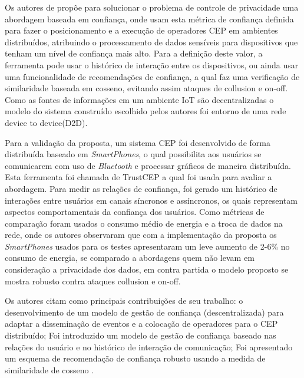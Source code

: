 \documentclass[ti,table]{texufpel} %
\begin{document}
     

     

    Os autores de \cite{art6dwarakanath2017trustcep} propõe para solucionar o problema de controle de privacidade uma abordagem baseada em confiança, onde usam esta métrica de confiança definida para fazer o posicionamento e a execução de operadores CEP em ambientes distribuídos, atribuindo o processamento de dados sensíveis para dispositivos que tenham um nível de confiança mais alto. Para a definição deste valor, a ferramenta pode usar o histórico de interação entre os dispositivos, ou ainda usar uma funcionalidade de recomendações de confiança, a qual faz uma verificação de similaridade baseada em cosseno, evitando assim ataques de collusion e on-off. Como as fontes de informações em um ambiente IoT são decentralizadas o modelo do sistema construído escolhido pelos autores foi entorno de uma rede device to device(D2D). 

     

     

    Para a validação da proposta, um sistema CEP foi desenvolvido de forma distribuída baseado em \textit{SmartPhones}, o qual possibilita aos usuários se comunicarem com uso de \textit{Bluetooth} e processar gráficos de maneira distribuída. Esta ferramenta foi chamada de TrustCEP a qual foi usada para avaliar a abordagem. Para medir as relações de confiança, foi gerado um histórico de interações entre usuários em canais síncronos e assíncronos, os quais representam aspectos comportamentais da confiança dos usuários. Como métricas de comparação foram usados o consumo médio de energia e a troca de dados na rede, onde os autores observaram que com a implementação da proposta os \textit{SmartPhones} usados para os testes apresentaram um leve aumento de 2-6\% no consumo de energia, se comparado a abordagens quem não levam em consideração a privacidade dos dados, em contra partida o modelo proposto se mostra robusto contra ataques collusion e on-off. 

    Os autores citam como principais contribuições de seu trabalho: o desenvolvimento de um modelo de gestão de confiança (descentralizada) para adaptar a disseminação de eventos e a colocação de operadores para o CEP distribuído; Foi introduzido um modelo de gestão de confiança baseado nas relações do usuário e no histórico de interação de comunicação; Foi apresentado um esquema de recomendação de confiança robusto usando a medida de similaridade de cosseno \cite{art6dwarakanath2017trustcep}. 
\end{document}
